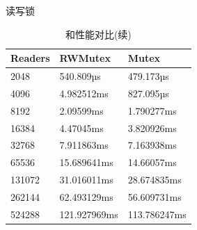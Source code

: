\begin{frame}{读写锁\RWMutex }
            \begin{table}[htbp!]
                \caption{\Mutex 和\RWMutex 性能对比(续)}
                \begin{tabular}{lll}
                    \hline
                    Readers  &RWMutex       &Mutex  \\
                    \hline
                    2048     &540.809µs     &479.173µs \\ 
                    4096     &4.982512ms    &827.095µs \\
                    8192     &2.09599ms     &1.790277ms \\
                    16384    &4.47045ms     &3.820926ms \\
                    32768    &7.911863ms    &7.163938ms \\
                    65536    &15.689641ms   &14.66057ms \\
                    131072   &31.016011ms   &28.674835ms \\
                    262144   &62.493129ms   &56.609731ms \\
                    524288   &121.927969ms  &113.786247ms \\   
                    \hline
                \end{tabular}
            \end{table} 
\end{frame}
\fi
